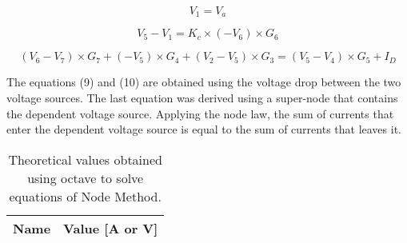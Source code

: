 \begin {equation}
V_1= V_a
  \label {eq:kvl}
\end{equation}

\begin {equation}
V_5 - V_1 = K_c\times (-V_6)\times G_6
  \label {eq:kvl}
\end{equation}

\begin {equation}
(V_6 - V_7)\times G_7 + (-V_5)\times G_4 + (V_2 - V_5)\times G_3 = (V_5 - V_4)\times G_5 + I_D
  \label {eq:kvl}
\end{equation}

The equations (9) and (10) are obtained using the voltage drop between the two voltage sources. The last equation was derived using a super-node that contains the dependent voltage source. Applying the node law, the sum of currents that enter the dependent voltage source is equal to the sum of currents that leaves it. 

\begin{table}[h]
  \centering
  \begin{tabular}{|l|r|}
    \hline    
    {\bf Name} & {\bf Value [A or V]} \\ \hline
    
  \end{tabular}
  \caption{Theoretical values obtained using octave to solve equations of Node Method.}
  \label{tab:NM}
\end{table}





